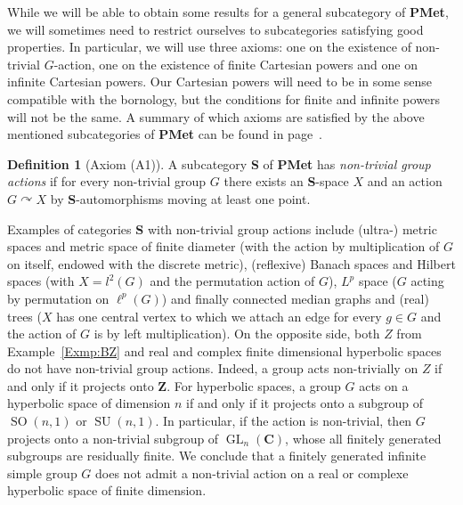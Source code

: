 \documentclass[a4paper]{article}
\theoremstyle{definition}
\newtheorem{defn}[lem]{Definition}
\DeclareMathOperator\GL{GL}
\DeclareMathOperator\SO{SO}
\DeclareMathOperator\SU{SU}
\newcommand*{\field}[1]{\mathbf{#1}}
\newcommand*{\category}[1]{\textbf{#1}}
\newcommand*{\PMet}{\category{PMet}}
\newcommand*{\CatS}{\category{S}}
\newcommand*{\Z}{\field{Z}}
\newcommand*{\C}{\field{C}}
\begin{document}
While we will be able to obtain some results for a general subcategory of \PMet, we will sometimes need to restrict ourselves to subcategories  satisfying good properties. In particular, we will use three axioms: one on the existence of non-trivial $G$-action, one on the existence of finite Cartesian powers and one on infinite Cartesian powers.
Our Cartesian powers will need to be in some sense compatible with the bornology, but the conditions for finite and infinite powers will not be the same.
A summary of which axioms are satisfied by the above mentioned subcategories of \PMet{} can be found in page~\pageref{Table1}.
%
%
\begin{defn}[Axiom (A1)]\label{Def:NonTrivialAction}
A subcategory \CatS{} of \PMet{} has \emph{non-trivial group actions} if for every non-trivial group $G$ there exists an \CatS-space $X$ and an action $G\curvearrowright X$ by \CatS-automorphisms moving at least one point.
\end{defn}
%
%
Examples of categories \CatS{} with non-trivial group actions include (ultra-) metric spaces and metric space of finite diameter (with the action by multiplication of $G$ on itself, endowed with the discrete metric), (reflexive) Banach spaces and Hilbert spaces (with $X=l^2(G)$ and the permutation action of $G$), $L^p$ space ($G$ acting by permutation on $\ell^p(G)$) and finally connected median graphs and (real) trees ($X$ has one central vertex to which we attach an edge for every $g\in G$ and the action of $G$ is by left multiplication).
On the opposite side, both $Z$ from Example~\ref{Exmp:BZ} and real and complex finite dimensional hyperbolic spaces do not have non-trivial group actions. Indeed, a group acts non-trivially on $Z$ if and only if it projects onto $\Z$.
For hyperbolic spaces, a group $G$ acts on a hyperbolic space of dimension $n$ if and only if it projects onto a subgroup of  $\SO(n,1)$ or $\SU(n,1)$. In particular, if the action is non-trivial, then $G$ projects onto a non-trivial subgroup of $\GL_n(\C)$, whose all finitely generated subgroups are residually finite.
We conclude that a finitely generated infinite simple group $G$ does not admit a non-trivial action on a real or complexe hyperbolic space of finite dimension.
\end{document}
